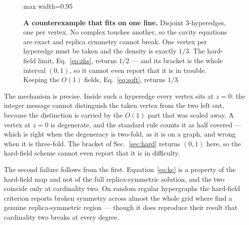 \begin{figure}[t]
\centering
\begin{adjustbox}{max width=0.95\linewidth}
\end{adjustbox}
\caption{\textbf{A counterexample that fits on one line.} Disjoint
$3$-hyperedges, one per vertex. No complex touches another, so the cavity
equations are exact and replica symmetry cannot break. One vertex per hyperedge
must be taken and the density is exactly $1/3$. The hard-field limit,
Eq.~\eqref{eq:zhs}, returns $1/2$ --- and its bracket is the whole interval
$(0,1)$, so it cannot even report that it is in trouble. Keeping the $O(1)$
fields, Eq.~\eqref{eq:soft}, returns $1/3$.}
\label{fig:counterexample}
\end{figure}

The mechanism is precise. Inside such a hyperedge every vertex sits at $z=0$: the
integer message cannot distinguish the taken vertex from the two left out,
because the distinction is carried by the $O(1)$ part that was scaled away. A
vertex at $z=0$ is degenerate, and the standard rule counts it as half covered
--- which is right when the degeneracy is two-fold, as it is on a graph, and
wrong when it is three-fold. The bracket of Sec.~\ref{sec:hard} returns $(0,1)$
here, so the hard-field scheme cannot even report that it is in difficulty.

The second failure follows from the first. Equation~\eqref{eq:kc} is a property
of the hard-field map and not of the full replica-symmetric solution, and the
two coincide only at cardinality two. On random regular hypergraphs the
hard-field criterion reports broken symmetry across almost the whole grid where
\citet{mezard2007} find a genuine replica-symmetric region --- though it
does reproduce their result that cardinality two breaks at every degree.

